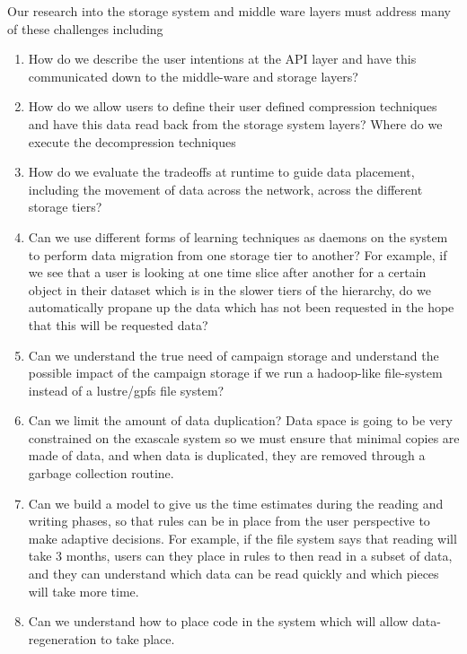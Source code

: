Our research into the storage system and middle ware layers must address many of these challenges including
\begin{enumerate}
\item  How do we describe the user intentions at the API layer and have this communicated down to the middle-ware and storage layers?
\item How do we allow users to define their user defined compression techniques and have this data read back from the storage system layers? Where do we execute the decompression techniques
\item How do we evaluate the tradeoffs at runtime to guide data placement, including the movement of data across the network, across the
different storage tiers? 
\item Can we use different forms of learning techniques as daemons on the system to perform data migration from one storage tier to another?
For example, if we see that a user is looking at one time slice after another for a certain object in their dataset which is in the slower tiers of 
the hierarchy, do we automatically propane up the data which has not been requested in the hope that this will be requested data?
\item Can we understand the true need of campaign storage and understand the possible impact of the campaign storage if we run a 
hadoop-like file-system instead of a lustre/gpfs file system?
\item Can we limit the amount of data duplication? Data space is going to be very constrained on the exascale system so we must ensure that
minimal copies are made of data, and when data is duplicated, they are removed through a garbage collection routine.
\item Can we build a model to give us the time estimates during the reading and writing phases, so that rules can be in place from the user
perspective to make adaptive decisions. For example, if the file system says that reading will take 3 months, users can they place in rules to
then read in a subset of data, and they can understand which data can be read quickly and which pieces will take more time.
\item Can we understand how to place code in the system which will allow data-regeneration to take place. 

\end{enumerate}

